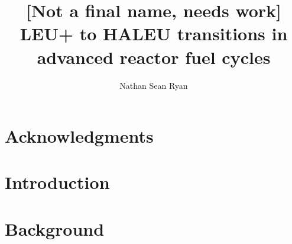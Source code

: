 \documentclass[edeposit,fullpage]{uiucthesis2018}
\title{[Not a final name, needs work] LEU+ to HALEU transitions in advanced reactor fuel cycles}
\author{Nathan Sean Ryan}
\begin{document}
\maketitle

\frontmatter
\begin{abstract}



\end{abstract}

\chapter*{Acknowledgments}




\tableofcontents
\listoftables
\listoffigures


\pagebreak
\mainmatter

\chapter{Introduction}
\label{ch:introduction}
\glsresetall




\chapter{Background}
\label{ch:background}
\glsresetall
\end{document}
